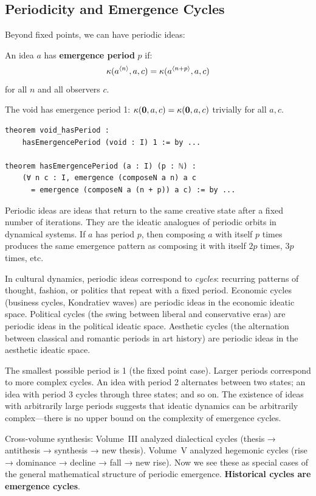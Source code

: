 \subsection{Periodicity and Emergence Cycles}

Beyond fixed points, we can have periodic ideas:

\begin{definition}
\label{def:period}
An idea $a$ has \textbf{emergence period} $p$ if:
\[
  \kappa(a^{\langle n \rangle}, a, c) = \kappa(a^{\langle n+p \rangle}, a, c)
\]
for all $n$ and all observers $c$.
\end{definition}

\begin{theorem}
\label{thm:void-period}
The void has emergence period 1: $\kappa(\mathbf{0}, a, c) = \kappa(\mathbf{0}, a, c)$
trivially for all $a, c$.
\end{theorem}

\begin{lstlisting}[caption={Periodicity (IDT\_v3\_Emergence.lean)}]
theorem void_hasPeriod :
    hasEmergencePeriod (void : I) 1 := by ...

theorem hasEmergencePeriod (a : I) (p : ℕ) :
    (∀ n c : I, emergence (composeN a n) a c
      = emergence (composeN a (n + p)) a c) := by ...
\end{lstlisting}

\begin{interpretation}
Periodic ideas are ideas that return to the same creative state after a fixed
number of iterations. They are the ideatic analogues of periodic orbits in
dynamical systems. If $a$ has period $p$, then composing $a$ with itself $p$
times produces the same emergence pattern as composing it with itself $2p$
times, $3p$ times, etc.

In cultural dynamics, periodic ideas correspond to \emph{cycles}: recurring
patterns of thought, fashion, or politics that repeat with a fixed period.
Economic cycles (business cycles, Kondratiev waves) are periodic ideas in the
economic ideatic space. Political cycles (the swing between liberal and
conservative eras) are periodic ideas in the political ideatic space. Aesthetic
cycles (the alternation between classical and romantic periods in art history)
are periodic ideas in the aesthetic ideatic space.

The smallest possible period is 1 (the fixed point case). Larger periods
correspond to more complex cycles. An idea with period 2 alternates between
two states; an idea with period 3 cycles through three states; and so on. The
existence of ideas with arbitrarily large periods suggests that ideatic
dynamics can be arbitrarily complex---there is no upper bound on the
complexity of emergence cycles.

Cross-volume synthesis: Volume~III analyzed dialectical cycles (thesis →
antithesis → synthesis → new thesis). Volume~V analyzed hegemonic cycles
(rise → dominance → decline → fall → new rise). Now we see these as special
cases of the general mathematical structure of periodic emergence.
\textbf{Historical cycles are emergence cycles}.
\end{interpretation}


